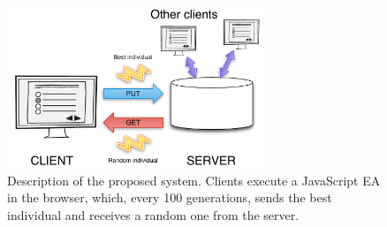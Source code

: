 \documentclass[letterpaper]{article}
\begin{document}
\begin{figure}[!t]
\centering
\includegraphics[width=3in]{system.pdf}
\caption{Description of the proposed system. Clients execute a JavaScript EA
  in the browser, which, every 100 generations, sends the best
  individual and receives a random one from the server.}
\label{fig:system}
\end{figure}
\end{document}
